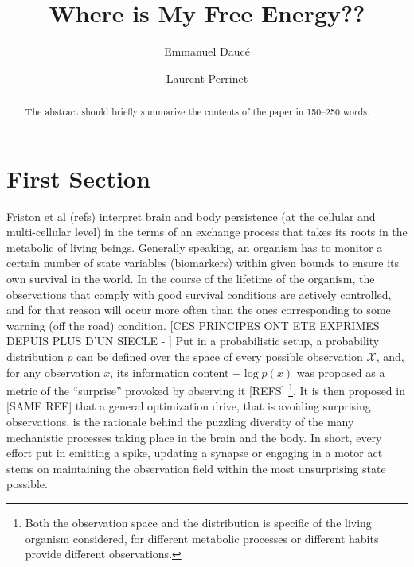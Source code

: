 \documentclass[runningheads]{llncs}
\begin{document}
%
\title{Where is My Free Energy??}
%
%
\author{Emmanuel Daucé \and
Laurent Perrinet}
%
%
%
\maketitle              %
%
\begin{abstract}
The abstract should briefly summarize the contents of the paper in
150--250 words.

\end{abstract}
%
%
%
\section{First Section}

Friston et al (refs) interpret brain and body persistence (at the cellular and multi-cellular level) in the terms of an exchange process that takes its roots in the metabolic of living beings. Generally speaking, an organism has to monitor a certain number of state variables (biomarkers) within given bounds to ensure its own survival in the world. In the course of the lifetime of the organism, the observations that comply with good survival conditions are actively controlled, and for that reason will occur more often than the ones corresponding to some warning (off the road) condition. 
[CES PRINCIPES ONT ETE EXPRIMES DEPUIS PLUS D'UN SIECLE - ]
Put in a probabilistic setup, a probability distribution $p$ can be defined over the space of every possible observation $\mathcal{X}$, and, for any observation $x$, its information content $-\log p(x)$ was proposed as a metric of the ``surprise'' provoked by observing it [REFS] \footnote{Both the observation space and the distribution is specific of the living organism considered, for different metabolic processes or different habits provide different observations.}. It is then proposed in [SAME REF] that a general optimization drive, that is avoiding surprising observations, is the rationale behind the puzzling diversity of the many mechanistic processes taking place in the brain and the body. In short, every effort put in emitting a spike, updating a synapse or engaging in a motor act stems on maintaining the observation field within the most unsurprising state possible.
\end{document}
